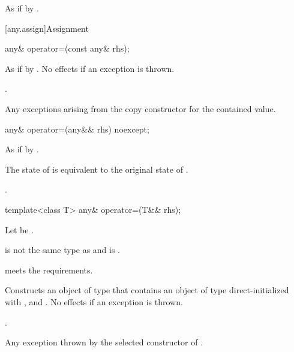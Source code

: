 \begin{itemdescr}
\pnum
\effects
As if by .
\end{itemdescr}

[any.assign]{Assignment}

%
\begin{itemdecl}
any& operator=(const any& rhs);
\end{itemdecl}

\begin{itemdescr}
\pnum
\effects
As if by .
No effects if an exception is thrown.

\pnum
\returns
{}.

\pnum
\throws
Any exceptions arising from the copy constructor for the contained value.
\end{itemdescr}

%
\begin{itemdecl}
any& operator=(any&& rhs) noexcept;
\end{itemdecl}

\begin{itemdescr}
\pnum
\effects
As if by .

\pnum
\ensures
The state of  is equivalent to the original state of .

\pnum
\returns
{}.
\end{itemdescr}

%
\begin{itemdecl}
template<class T>
  any& operator=(T&& rhs);
\end{itemdecl}

\begin{itemdescr}
\pnum
Let  be .

\pnum
\constraints
{} is not the same type as  and
 is .

\pnum
\expects
{} meets the  requirements.

\pnum
\effects
Constructs an object  of type  that contains an object of type  direct-initialized with , and .
No effects if an exception is thrown.

\pnum
\returns
{}.

\pnum
\throws
Any exception thrown by the selected constructor of .
\end{itemdescr}

